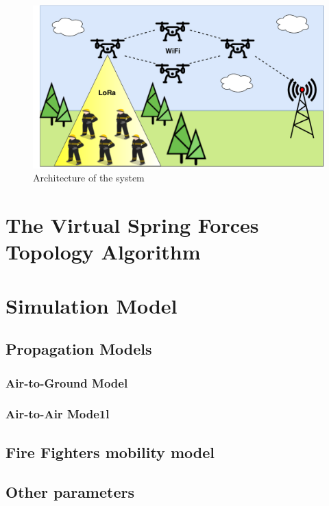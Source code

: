 \begin{figure}[ht]
    \centering
    \includegraphics[width=1\textwidth]{images/system-architecture.pdf}
    \caption{Architecture of the system}
    \label{fig:system-architecture}
\end{figure}


\section{The Virtual Spring Forces Topology Algorithm}

\section{Simulation Model}



\subsection{Propagation Models}

\subsubsection{Air-to-Ground Model}

\subsubsection{Air-to-Air Mode1l}

\subsection{Fire Fighters mobility model}

\subsection{Other parameters}
